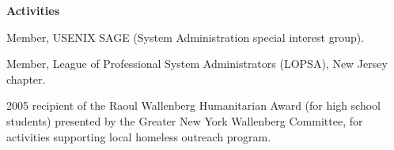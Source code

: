 \documentclass[letterpaper,11pt]{article}
\newcommand{\resheading}[1]{{\large \colorbox{mygrey}{\begin{minipage}{\textwidth}{\textbf{#1 \vphantom{p\^{E}}}}\end{minipage}}}}
\begin{document}
\resheading{Activities}
	\begin{description}
		\item Member, USENIX SAGE (System Administration special
                  interest group).
                \item Member, League of Professional System Administrators
                  (LOPSA), New Jersey chapter.
                \item 2005 recipient of the Raoul Wallenberg Humanitarian
                  Award (for high school students) presented by the Greater
                  New York Wallenberg Committee, for activities supporting
                  local homeless outreach program.
	\end{description}

\end{document}
